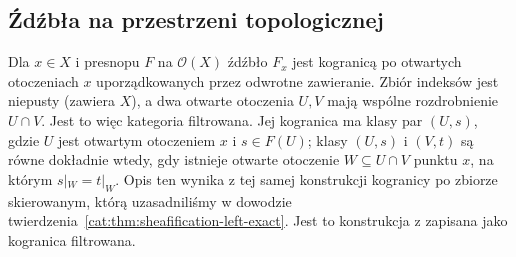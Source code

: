 \subsection{Źdźbła na przestrzeni topologicznej}

Dla $x\in X$ i presnopu $F$ na $\mathcal O(X)$ źdźbło $F_x$ jest kogranicą po otwartych otoczeniach $x$ uporządkowanych przez odwrotne zawieranie. Zbiór indeksów jest niepusty (zawiera $X$), a dwa otwarte otoczenia $U,V$ mają wspólne rozdrobnienie $U\cap V$. Jest to więc kategoria filtrowana. Jej kogranica ma klasy par $(U,s)$, gdzie $U$ jest otwartym otoczeniem $x$ i $s\in F(U)$; klasy $(U,s)$ i $(V,t)$ są równe dokładnie wtedy, gdy istnieje otwarte otoczenie $W\subseteq U\cap V$ punktu $x$, na którym $s|_W=t|_W$. Opis ten wynika z tej samej konstrukcji kogranicy po zbiorze skierowanym, którą uzasadniliśmy w dowodzie twierdzenia~\ref{cat:thm:sheafification-left-exact}. Jest to konstrukcja z  zapisana jako kogranica filtrowana.

